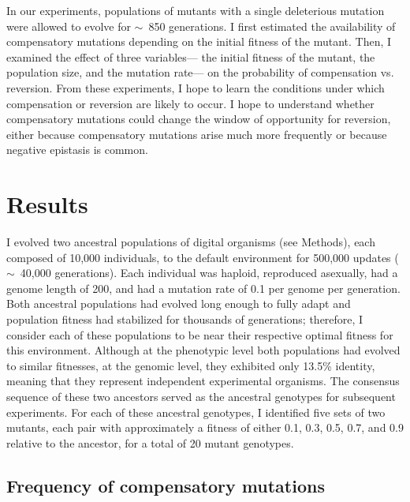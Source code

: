 \begin{doublespace}
In our experiments, populations of mutants
with a single deleterious mutation
were allowed to evolve for $\sim$~850 generations.
%
I first estimated the availability of compensatory mutations
depending on the initial fitness of the mutant.
%
Then, I examined the effect of three variables---%
the initial fitness of the mutant, the population size,
and the mutation rate---%
on the probability of compensation vs. reversion.
%
From these experiments, I hope to learn the conditions under which
compensation or reversion are likely to occur.
%
I hope to understand whether compensatory mutations
could change the window of opportunity for reversion,
either because compensatory mutations arise much more frequently
or because negative epistasis is common.



\section{Results}

I evolved two ancestral populations of digital organisms (see Methods),
each composed of 10,000 individuals,
to the default environment for 500,000 updates ($\sim$~40,000 generations).
%
Each individual was haploid, reproduced asexually,
had a genome length of 200, and had a mutation rate of 0.1
per genome per generation.
%
Both ancestral populations had evolved long enough to fully adapt
and population fitness had stabilized for thousands of generations;
therefore, I consider each of these populations
to be near their respective optimal fitness for this environment.
%
Although at the phenotypic level both populations
had evolved to similar fitnesses,
at the genomic level, they exhibited only 13.5\% identity,
meaning that they represent independent experimental organisms.
%
The consensus sequence of these two ancestors served
as the ancestral genotypes for subsequent experiments.
%
For each of these ancestral genotypes,
I identified five sets of two mutants,
each pair with approximately a fitness of either
0.1, 0.3, 0.5, 0.7, and 0.9 relative to the ancestor,
for a total of 20 mutant genotypes.



\subsection{Frequency of compensatory mutations}


\end{doublespace}
